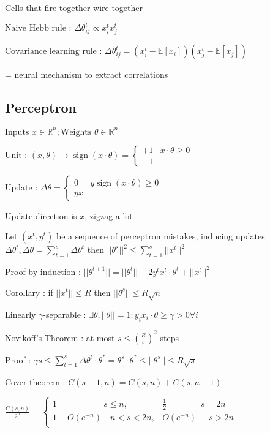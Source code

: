 \documentclass[a2paper,4pt]{extarticle}
\newcommand{\E}{\mathbb{E}}
\newcommand{\R}{\mathbb{R}}
\DeclareMathOperator{\sign}{sign}
\begin{document}
\begin{landscape}
\begin{multicols*}{7}
Cells that fire together wire together

$
\text{Naive Hebb rule : } 
\Delta \theta_{i j}^t \propto x_i^t x_j^t
$

$
\text{Covariance learning rule : } 
\Delta \theta_{i j}^t =
(x_i^t - \E[x_i]) ( x_j^t - \E[x_j])
$

= neural mechanism to extract correlations

\subsection{Perceptron}

$
\text{Inputs } x \in \R^n; \text{Weights } \theta \in \R^n
$

$
\text{Unit : }
(x,\theta) \rightarrow \sign(x \cdot \theta) =
\begin{cases} 
      +1 & x \cdot \theta \geq 0 \\
      -1
   \end{cases}
$ 

$
\text{Update : }
\Delta \theta = 
\begin{cases} 
      0 & y \sign(x \cdot \theta) \geq 0 \\
      y x
   \end{cases}
$ 

Update direction is $x$, zigzag a lot

Let $(x^t,y^t)$ be a sequence of perceptron mistakes, inducing updates $\Delta \theta^t, \Delta \theta = \sum_{t=1}^s \Delta \theta^t$ then $||\theta^s||^2 \leq \sum_{t=1}^s ||x^t||^2$

Proof by induction : $||\theta^{t+1}|| = ||\theta^{t}|| + 2 y^t x^t \cdot \theta^t + ||x^t||^2$ 

Corollary : if $||x^t|| \leq R$ then $||\theta^s|| \leq R \sqrt{n}$

Linearly $\gamma$-separable : $
\exists \theta, ||\theta||=1 :
y_i x_i \cdot \theta \geq \gamma > 0 \forall i
$

Novikoff's Theorem : at most 
$s \leq \left( \frac{R}{s} \right)^2$ steps

Proof : $\gamma s \leq \sum_{t=1}^s \Delta \theta^t \cdot \theta^*
= \theta^s \cdot \theta^* \leq ||\theta^s|| \leq R \sqrt{s}
$

Cover theorem : $C(s+1, n) = C(s,n) + C(s, n-1)$

$\frac{C(s,n)}{2^n} =
\begin{cases} 
      1 \quad\quad\quad\quad\quad\;\, s \leq n,
      & \frac{1}{2} \quad\quad\quad\quad s = 2n \\
      1 - O(e^{-n}) \quad n < s < 2n,
      & O(e^{-n}) \quad\;\, s > 2n\\
   \end{cases}
$


\end{multicols*}
\end{landscape}
\end{document}
